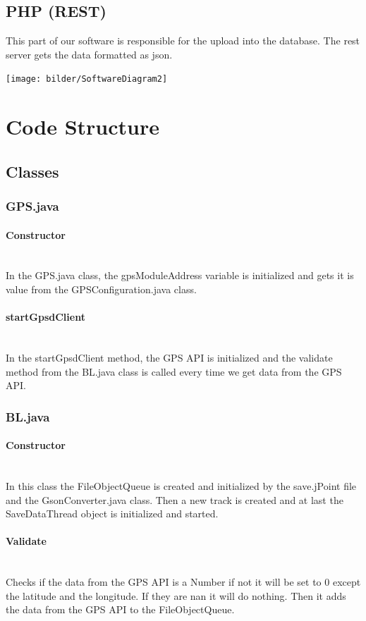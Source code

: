 \subsection{PHP (REST)}
This part of our software is responsible for the upload into the database. The \gls{rest} server gets the data formatted as \gls{json}.
\begin{center}
\texttt{[image: bilder/SoftwareDiagram2]}
\end{center} 
\clearpageauthor
\section{Code Structure}
\subsection{Classes}
\subsubsection{GPS.java}
\paragraph{Constructor}\mbox{}\\
In the GPS.java class, the gpsModuleAddress variable is initialized and gets it is value from the GPSConfiguration.java class.
\paragraph{startGpsdClient}\mbox{}\\
In the startGpsdClient method, the GPS API is initialized and the validate method from the BL.java class is called every time we get data from the GPS API.
\subsubsection{BL.java}
\paragraph{Constructor}\mbox{}\\
In this class the FileObjectQueue is created and initialized by the save.jPoint file and the GsonConverter.java class. 
Then a new track is created and at last the SaveDataThread object is initialized and started.
\paragraph{Validate}\mbox{}\\
Checks if the data from the GPS API is a Number if not it will be set to 0 except the latitude and the longitude. If they are \gls{nan} it will do nothing. 
Then it adds the data from the GPS API to the FileObjectQueue.
